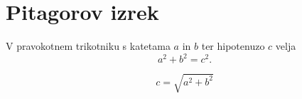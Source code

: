 \documentclass{article}
\begin{document}
\section*{Pitagorov izrek}
V pravokotnem trikotniku s katetama \(a\) in \(b\) ter hipotenuzo \(c\) velja
\[ a^2 + b^2 = c^2. \]

\[ c = \sqrt{ a^2+b^2}\]
\end{document}
